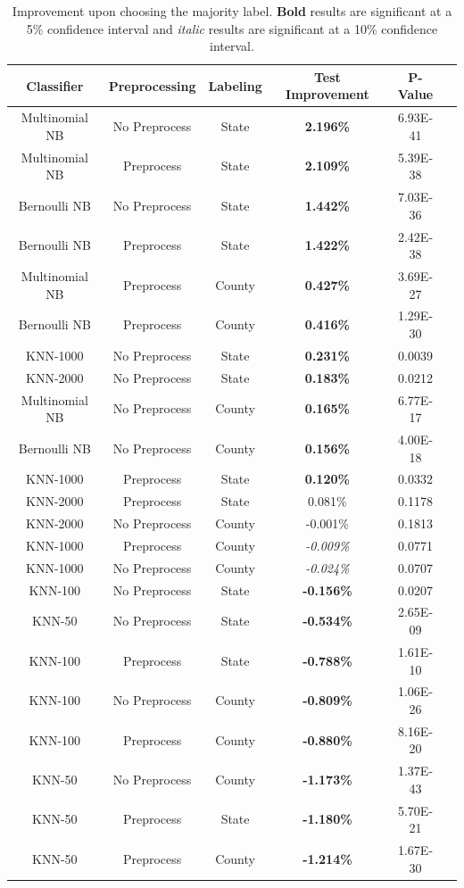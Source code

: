 \documentclass[midd]{thesis}
\begin{document}
\begin{table}
\label{table:finalResults}
\caption{Improvement upon choosing the majority label. \textbf{Bold} results are significant at a 5\% confidence interval and \textit{italic} results are significant at a 10\% confidence interval.\newline }
\centering 
  \begin{tabular}{| c | c | c | c | c  | c |}
  \hline      
Classifier & Preprocessing & Labeling & Test Improvement & P-Value \\
  \hline                 
Multinomial NB & No Preprocess & State  & \textbf{2.196\%} & 6.93E-41 \\
Multinomial NB & Preprocess & State  & \textbf{2.109\%} & 5.39E-38 \\
Bernoulli NB & No Preprocess & State  & \textbf{1.442\%} & 7.03E-36 \\
Bernoulli NB & Preprocess & State  & \textbf{1.422\%} & 2.42E-38 \\
Multinomial NB & Preprocess & County & \textbf{0.427\%} & 3.69E-27 \\
Bernoulli NB & Preprocess & County & \textbf{0.416\%} & 1.29E-30 \\
KNN-1000 & No Preprocess & State  & \textbf{0.231\%} & 0.0039 \\
KNN-2000 & No Preprocess & State &  \textbf{0.183\%} & 0.0212 \\
Multinomial NB & No Preprocess & County & \textbf{0.165\%} & 6.77E-17 \\
Bernoulli NB & No Preprocess & County & \textbf{0.156\%} & 4.00E-18 \\
KNN-1000 & Preprocess & State & \textbf{0.120\%} & 0.0332 \\
KNN-2000 & Preprocess & State & 0.081\% & 0.1178 \\
KNN-2000 & No Preprocess & County & -0.001\% & 0.1813 \\
KNN-1000 & Preprocess & County & \textit{-0.009\%} & 0.0771 \\
KNN-1000 & No Preprocess & County & \textit{-0.024\%} & 0.0707 \\
KNN-100 & No Preprocess & State & \textbf{-0.156\%} & 0.0207 \\
KNN-50 & No Preprocess & State & \textbf{-0.534\%} & 2.65E-09 \\
KNN-100 & Preprocess & State & \textbf{-0.788\%} & 1.61E-10 \\
KNN-100 & No Preprocess & County & \textbf{-0.809\%} & 1.06E-26 \\
KNN-100 & Preprocess & County & \textbf{-0.880\%} & 8.16E-20 \\
KNN-50 & No Preprocess & County & \textbf{-1.173\%} & 1.37E-43 \\
KNN-50 & Preprocess & State & \textbf{-1.180\%} & 5.70E-21 \\
KNN-50 & Preprocess & County & \textbf{-1.214\%} & 1.67E-30 \\  
\hline  
  \end{tabular}
\end{table}
\end{document}
